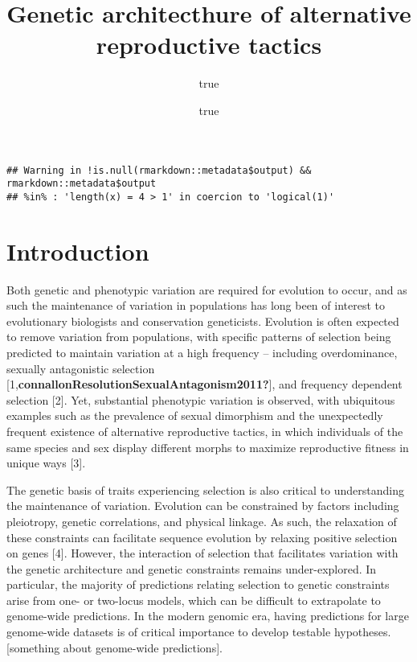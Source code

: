 \documentclass[
  11pt,
]{article}
\title{Genetic architecthure of alternative reproductive tactics}
\author{true \and true}
\date{}
\begin{document}
\maketitle

\begin{verbatim}
## Warning in !is.null(rmarkdown::metadata$output) && rmarkdown::metadata$output
## %in% : 'length(x) = 4 > 1' in coercion to 'logical(1)'
\end{verbatim}

\hypertarget{introduction}{%
\section{Introduction}\label{introduction}}

Both genetic and phenotypic variation are required for evolution to
occur, and as such the maintenance of variation in populations has long
been of interest to evolutionary biologists and conservation
geneticists. Evolution is often expected to remove variation from
populations, with specific patterns of selection being predicted to
maintain variation at a high frequency -- including overdominance,
sexually antagonistic selection
{[}1,\textbf{connallonResolutionSexualAntagonism2011?}{]}, and frequency dependent
selection {[}2{]}. Yet, substantial phenotypic
variation is observed, with ubiquitous examples such as the prevalence
of sexual dimorphism and the unexpectedly frequent existence of
alternative reproductive tactics, in which individuals of the same
species and sex display different morphs to maximize reproductive
fitness in unique ways {[}3{]}.

The genetic basis of traits experiencing selection is also critical to
understanding the maintenance of variation. Evolution can be constrained
by factors including pleiotropy, genetic correlations, and physical
linkage. As such, the relaxation of these constraints can facilitate
sequence evolution by relaxing positive selection on genes
{[}4{]}. However, the interaction of
selection that facilitates variation with the genetic architecture and
genetic constraints remains under-explored. In particular, the majority
of predictions relating selection to genetic constraints arise from one-
or two-locus models, which can be difficult to extrapolate to
genome-wide predictions. In the modern genomic era, having predictions
for large genome-wide datasets is of critical importance to develop
testable hypotheses. {[}something about genome-wide predictions{]}.
\end{document}
